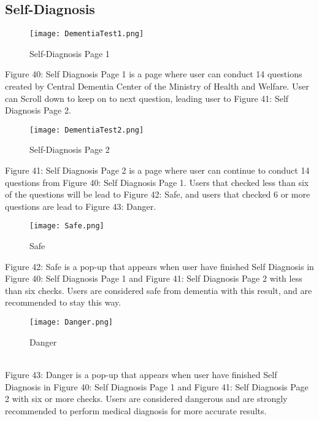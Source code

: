 \documentclass[conference]{IEEEtran}
\begin{document}
\subsection{Self-Diagnosis}
\begin{figure}[h]
\centerline{\texttt{[image: DementiaTest1.png]}}
\caption{Self-Diagnosis Page 1}
\label{fig}
\end{figure}
Figure 40: Self Diagnosis Page 1 is a page where user can conduct 14 questions created by Central Dementia Center of the Ministry of Health and Welfare. User can Scroll down to keep on to next question, leading user to Figure 41: Self Diagnosis Page 2.

\begin{figure}[h]
\centerline{\texttt{[image: DementiaTest2.png]}}
\caption{Self-Diagnosis Page 2}
\label{fig}
\end{figure}
Figure 41: Self Diagnosis Page 2 is a page where user can continue to conduct 14 questions from Figure 40: Self Diagnosis Page 1. Users that checked less than six of the questions will be lead to Figure 42: Safe, and users that checked 6 or more questions are lead to Figure 43: Danger.

\begin{figure}[h]
\centerline{\texttt{[image: Safe.png]}}
\caption{Safe}
\label{fig}
\end{figure}
Figure 42: Safe is a pop-up that appears when user have finished Self Diagnosis in Figure 40: Self Diagnosis Page 1 and Figure 41: Self Diagnosis Page 2 with less than six checks. Users are considered safe from dementia with this result, and are recommended to stay this way.
\\
\begin{figure}[h]
\centerline{\texttt{[image: Danger.png]}}
\caption{Danger}
\label{fig}
\end{figure}
\\
Figure 43: Danger is a pop-up that appears when user have finished Self Diagnosis in Figure 40: Self Diagnosis Page 1 and Figure 41: Self Diagnosis Page 2 with six or more checks. Users are considered dangerous and are strongly recommended to perform medical diagnosis for more accurate results. 
\end{document}
